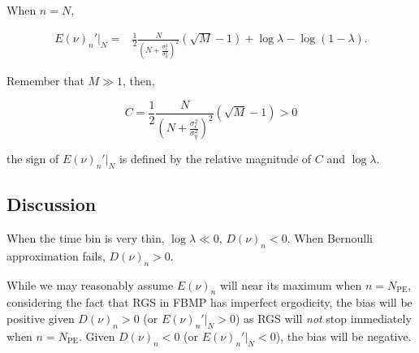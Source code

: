 When $n=N$,

\begin{equation}
\begin{aligned}
    E(\nu)_n'|_N =& \frac{1}{2}\frac{N}{\left(N+\frac{\sigma_\epsilon^2}{\sigma_q^2}\right)^2}(\sqrt{M}-1) + \log\lambda - \log(1-\lambda).
\end{aligned}
\end{equation}

Remember that $M \gg 1$, then,

\begin{equation}
    C = \frac{1}{2}\frac{N}{\left(N+\frac{\sigma_\epsilon^2}{\sigma_q^2}\right)^2}(\sqrt{M}-1) > 0
\end{equation}

the sign of $E(\nu)_n'|_N$ is defined by the relative magnitude of $C$ and $\log\lambda$. 

\subsection{Discussion}

When the time bin is very thin, $\log\lambda \ll 0$, $D(\nu)_n < 0$. When Bernoulli approximation fails, $D(\nu)_n > 0$. 

While we may reasonably assume $E(\nu)_n$ will near its maximum when $n=N_\mathrm{PE}$, considering the fact that RGS in FBMP has imperfect ergodicity, the bias will be positive given $D(\nu)_n > 0$ (or $E(\nu)_n'|_N > 0$) as RGS will \emph{not} stop immediately when $n=N_\mathrm{PE}$. Given $D(\nu)_n < 0$ (or $E(\nu)_n'|_N < 0$), the bias will be negative. 
